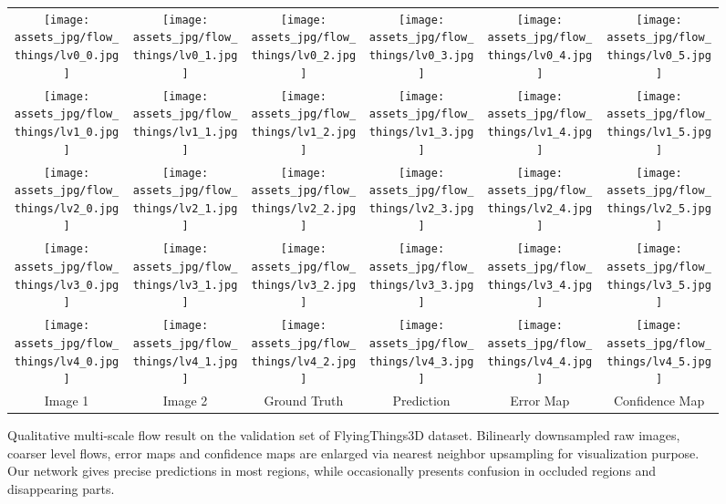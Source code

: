 \begin{figure*}[t]
\centering
\footnotesize
\begin{tabular}{@{}c @{\hskip 0.05in} c @{\hskip 0.05in} c @{\hskip 0.05in} c @{\hskip 0.05in} c @{\hskip 0.05in} c@{}}

\texttt{[image: assets\_jpg/flow\_things/lv0\_0.jpg]}
&
\texttt{[image: assets\_jpg/flow\_things/lv0\_1.jpg]}
&
\texttt{[image: assets\_jpg/flow\_things/lv0\_2.jpg]}
&
\texttt{[image: assets\_jpg/flow\_things/lv0\_3.jpg]}
&
\texttt{[image: assets\_jpg/flow\_things/lv0\_4.jpg]}
&
\texttt{[image: assets\_jpg/flow\_things/lv0\_5.jpg]}
 \\
\texttt{[image: assets\_jpg/flow\_things/lv1\_0.jpg]}
&
\texttt{[image: assets\_jpg/flow\_things/lv1\_1.jpg]}
&
\texttt{[image: assets\_jpg/flow\_things/lv1\_2.jpg]}
&
\texttt{[image: assets\_jpg/flow\_things/lv1\_3.jpg]}
&
\texttt{[image: assets\_jpg/flow\_things/lv1\_4.jpg]}
&
\texttt{[image: assets\_jpg/flow\_things/lv1\_5.jpg]}
 \\
\texttt{[image: assets\_jpg/flow\_things/lv2\_0.jpg]}
&
\texttt{[image: assets\_jpg/flow\_things/lv2\_1.jpg]}
&
\texttt{[image: assets\_jpg/flow\_things/lv2\_2.jpg]}
&
\texttt{[image: assets\_jpg/flow\_things/lv2\_3.jpg]}
&
\texttt{[image: assets\_jpg/flow\_things/lv2\_4.jpg]}
&
\texttt{[image: assets\_jpg/flow\_things/lv2\_5.jpg]}
 \\
\texttt{[image: assets\_jpg/flow\_things/lv3\_0.jpg]}
&
\texttt{[image: assets\_jpg/flow\_things/lv3\_1.jpg]}
&
\texttt{[image: assets\_jpg/flow\_things/lv3\_2.jpg]}
&
\texttt{[image: assets\_jpg/flow\_things/lv3\_3.jpg]}
&
\texttt{[image: assets\_jpg/flow\_things/lv3\_4.jpg]}
&
\texttt{[image: assets\_jpg/flow\_things/lv3\_5.jpg]}
 \\
\texttt{[image: assets\_jpg/flow\_things/lv4\_0.jpg]}
&
\texttt{[image: assets\_jpg/flow\_things/lv4\_1.jpg]}
&
\texttt{[image: assets\_jpg/flow\_things/lv4\_2.jpg]}
&
\texttt{[image: assets\_jpg/flow\_things/lv4\_3.jpg]}
&
\texttt{[image: assets\_jpg/flow\_things/lv4\_4.jpg]}
&
\texttt{[image: assets\_jpg/flow\_things/lv4\_5.jpg]}
 \\
Image 1 & Image 2 & Ground Truth & Prediction & Error Map & Confidence Map
\end{tabular}
\caption{Qualitative multi-scale flow result on the validation set of FlyingThings3D dataset. Bilinearly downsampled raw images, coarser level flows, error maps and confidence maps are enlarged via nearest neighbor upsampling for visualization purpose. Our network gives precise predictions in most regions, while occasionally presents confusion in occluded regions and disappearing parts.}
\label{fig::things_flow}
\end{figure*}

